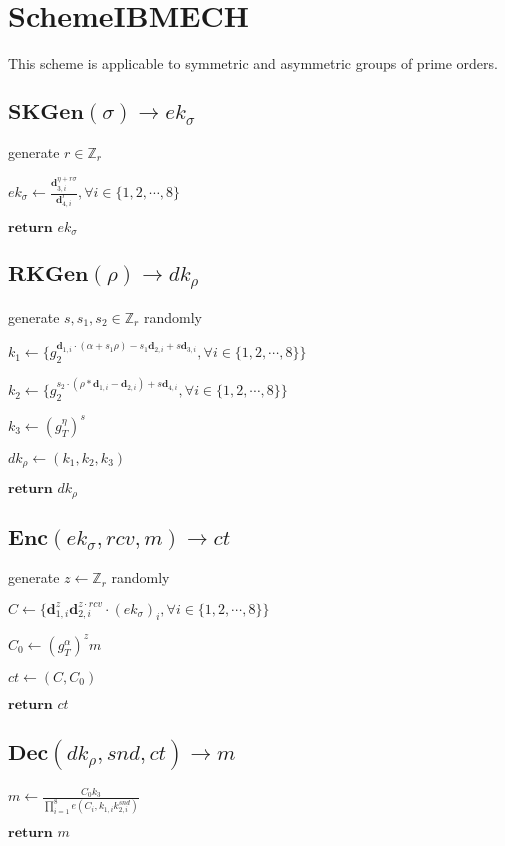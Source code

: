 \documentclass[a4paper]{article}
\begin{document}
\section{SchemeIBMECH}

This scheme is applicable to symmetric and asymmetric groups of prime orders. 

\subsection{$\textbf{SKGen}(\sigma) \rightarrow \textit{ek}_\sigma$}

generate $r \in \mathbb{Z}_r$

$\textit{ek}_\sigma \gets \frac{\bm{d}_{3, i}^{\eta + r \sigma}}{\bm{d}_{4, i}^r}, \forall i \in \{1, 2, \cdots, 8\}$

$\textbf{return }\textit{ek}_\sigma$

\subsection{$\textbf{RKGen}(\rho) \rightarrow \textit{dk}_\rho$}

generate $s, s_1, s_2 \in \mathbb{Z}_r$ randomly

$k_1 \gets \{g_2^{\bm{d}_{1, i} \cdot (\alpha + s_1 \rho) - s_1 \bm{d}_{2, i} + s \bm{d}_{3, i}}, \forall i \in \{1, 2, \cdots, 8\}\}$

$k_2 \gets \{g_2^{s_2 \cdot (\rho * \bm{d}_{1, i} - \bm{d}_{2, i}) + s \bm{d}_{4, i}}, \forall i \in \{1, 2, \cdots, 8\}\}$

$k_3 \gets (g_T^\eta)^s$

$\textit{dk}_\rho \gets (k_1, k_2, k_3)$

$\textbf{return }\textit{dk}_\rho$

\subsection{$\textbf{Enc}(\textit{ek}_\sigma, \textit{rcv}, m) \rightarrow \textit{ct}$}

generate $z \gets \mathbb{Z}_r$ randomly

$C \gets \{\bm{d}_{1, i}^z \bm{d}_{2, i}^{z \cdot \textit{rcv}} \cdot (\textit{ek}_\sigma)_i, \forall i \in \{1, 2, \cdots, 8\}\}$

$C_0 \gets (g_T^\alpha)^z m$

$\textit{ct} \gets (C, C_0)$

$\textbf{return }\textit{ct}$

\subsection{$\textbf{Dec}(\textit{dk}_\rho, \textit{snd}, \textit{ct}) \rightarrow m$}

$m \gets \frac{C_0 k_3}{\prod\limits_{i = 1}^8 e(C_i, k_{1, i} k_{2, i}^\textit{snd})}$

$\textbf{return }m$
\end{document}
